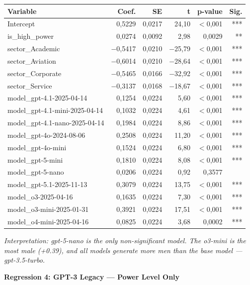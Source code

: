 \documentclass[12pt,a4paper]{article}
\begin{document}
\begin{table}[H]
\centering
\small
\begin{tabular}{lrrrrr}
\toprule
\textbf{Variable} & \textbf{Coef.} & \textbf{SE} & \textbf{t} & \textbf{p-value} & \textbf{Sig.} \\
\midrule
Intercept & 0,5229 & 0,0217 & 24,10 & $<$0,001 & *** \\
is\_high\_power & 0,0274 & 0,0092 & 2,98 & 0,0029 & ** \\
sector\_Academic & $-$0,5417 & 0,0210 & $-$25,79 & $<$0,001 & *** \\
sector\_Aviation & $-$0,6014 & 0,0210 & $-$28,64 & $<$0,001 & *** \\
sector\_Corporate & $-$0,5465 & 0,0166 & $-$32,92 & $<$0,001 & *** \\
sector\_Service & $-$0,3137 & 0,0168 & $-$18,67 & $<$0,001 & *** \\
model\_gpt-4.1-2025-04-14 & 0,1254 & 0,0224 & 5,60 & $<$0,001 & *** \\
model\_gpt-4.1-mini-2025-04-14 & 0,1032 & 0,0224 & 4,61 & $<$0,001 & *** \\
model\_gpt-4.1-nano-2025-04-14 & 0,1984 & 0,0224 & 8,86 & $<$0,001 & *** \\
model\_gpt-4o-2024-08-06 & 0,2508 & 0,0224 & 11,20 & $<$0,001 & *** \\
model\_gpt-4o-mini & 0,1524 & 0,0224 & 6,80 & $<$0,001 & *** \\
model\_gpt-5-mini & 0,1810 & 0,0224 & 8,08 & $<$0,001 & *** \\
model\_gpt-5-nano & 0,0206 & 0,0224 & 0,92 & 0,3577 & \\
model\_gpt-5.1-2025-11-13 & 0,3079 & 0,0224 & 13,75 & $<$0,001 & *** \\
model\_o3-2025-04-16 & 0,1635 & 0,0224 & 7,30 & $<$0,001 & *** \\
model\_o3-mini-2025-01-31 & 0,3921 & 0,0224 & 17,51 & $<$0,001 & *** \\
model\_o4-mini-2025-04-16 & 0,0825 & 0,0224 & 3,68 & 0,0002 & *** \\
\bottomrule
\end{tabular}
\end{table}

\noindent\textit{Interpretation: gpt-5-nano is the only non-significant model. The
o3-mini is the most male (+0.39), and all models generate more men
than the base model --- gpt-3.5-turbo.}

\vspace{0.5cm}
\noindent\textbf{Regression 4: GPT-3 Legacy --- Power Level Only}
\end{document}
